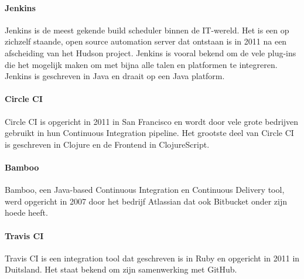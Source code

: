             
            \paragraph{Jenkins}
            Jenkins is de meest gekende build scheduler binnen de IT-wereld. Het is een op zichzelf staande, open source automation server dat ontstaan is in 2011 na een afscheiding van het Hudson project. Jenkins is vooral bekend om de vele plug-ins die het mogelijk maken om met bijna alle talen en platformen te integreren. Jenkins is geschreven in Java en draait op een Java platform.
            
            \paragraph{Circle CI}
            Circle CI is opgericht in 2011 in San Francisco en wordt door vele grote bedrijven gebruikt in hun Continuous Integration pipeline. Het grootste deel van Circle CI is geschreven in Clojure en de Frontend in ClojureScript. 

            \paragraph{Bamboo}
            Bamboo, een Java-based Continuous Integration en Continuous Delivery tool, werd opgericht in 2007 door het bedrijf Atlassian dat ook Bitbucket onder zijn hoede heeft.
            
            \paragraph{Travis CI}
            Travis CI is een integration tool dat geschreven is in Ruby en opgericht in 2011 in Duitsland. Het staat bekend om zijn samenwerking met GitHub.
            
